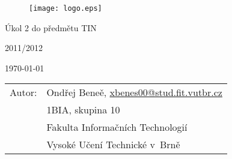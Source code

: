 \begin{titlepage}

\begin{figure}[!h]
\centering
\texttt{[image: logo.eps]}

\end{figure}

\vfill

\begin{center}
\begin{Huge}
Úkol 2 do předmětu TIN\\
\end{Huge}
\begin{Large}
2011/2012 \\
\end{Large}
\end{center}

\vfill

\begin{center}
\begin{Large}
\today
\end{Large}
\end{center}

\vfill

\begin{flushleft}
\begin{large}
\begin{tabular}{ll}
Autor: & Ondřej Beneě, \url{xbenes00@stud.fit.vutbr.cz} \\
 & 1BIA, skupina 10 \\
 & Fakulta Informačních Technologií \\
 & Vysoké Učení Technické v~Brně \\
\end{tabular}
\end{large}
\end{flushleft}
\end{titlepage}
